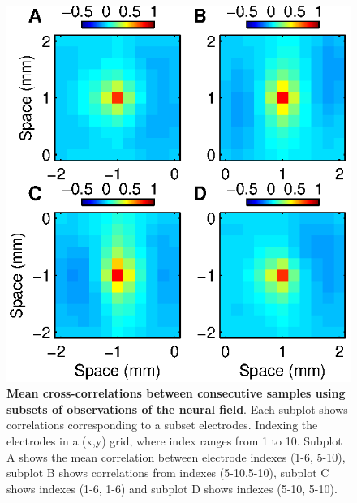 \documentclass[]{article}
\begin{document}
\begin{figure}[!ht]
\begin{center}
\includegraphics{./Figures/HomoTestCrossCorr.eps}
\end{center}
\caption{{\bf Mean cross-correlations between consecutive samples using subsets of observations of the neural field}. Each subplot shows correlations corresponding to a subset electrodes. Indexing the electrodes in a (x,y) grid, where index ranges from 1 to 10. Subplot A shows the mean correlation between electrode indexes (1-6, 5-10), subplot B shows correlations from indexes (5-10,5-10), subplot C shows indexes (1-6, 1-6) and subplot D shows indexes (5-10, 5-10).}
\label{fig:HomogeneityTest}
\end{figure}
\end{document}
